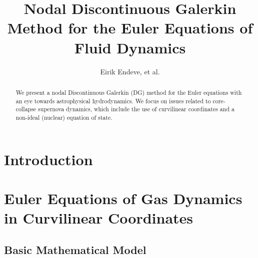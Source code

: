 \documentclass[10pt,preprint]{aastex}
\begin{document}
\title{Nodal Discontinuous Galerkin Method for the Euler Equations of Fluid Dynamics}
\author{Eirik Endeve, et al.}

\begin{abstract}
We present a nodal Discontinuous Galerkin (DG) method for the Euler equations with an eye towards astrophysical hydrodynamics.  
We focus on issues related to core-collapse supernova dynamics, which include the use of curvilinear coordinates and a non-ideal (nuclear) equation of state.  
\end{abstract}

\tableofcontents

\section{Introduction}

\section{Euler Equations of Gas Dynamics in Curvilinear Coordinates}

\subsection{Basic Mathematical Model}
\end{document}
